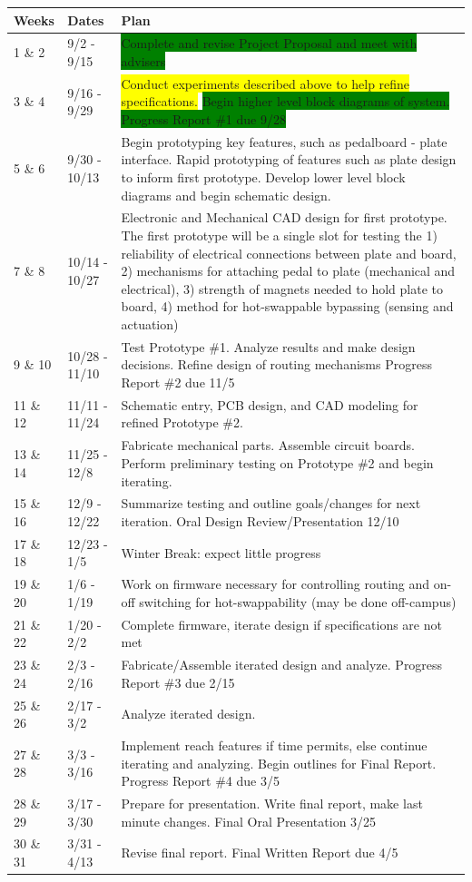 \documentclass{article}
\begin{document}
\begin{table}[H]
\begin{tabular}{llp{4in}}
Weeks    & Dates         & Plan \\
\hline
1 \& 2   & 9/2 - 9/15    &  \colorbox{green}{Complete and revise Project Proposal and meet with advisers}      \\
3 \& 4   & 9/16 - 9/29   &  \colorbox{yellow}{Conduct experiments described above to help refine specifications.}  \colorbox{green}{Begin higher level block diagrams of system.  Progress Report \#1 due 9/28}    \\
5 \& 6   & 9/30 - 10/13  &  Begin prototyping key features, such as pedalboard - plate interface. Rapid prototyping of features such as plate design to inform first prototype. Develop lower level block diagrams and begin schematic design.    \\
7 \& 8   & 10/14 - 10/27 &  Electronic and Mechanical CAD design for first prototype.  The first prototype will be a single slot for testing the 1) reliability of electrical connections between plate and board, 2) mechanisms for attaching pedal to plate (mechanical and electrical), 3) strength of magnets needed to hold plate to board, 4) method for hot-swappable bypassing (sensing and actuation)    \\
9 \& 10  & 10/28 - 11/10 &  Test Prototype \#1.  Analyze results and make design decisions.  Refine design of routing mechanisms Progress Report \#2 due 11/5    \\
11 \& 12 & 11/11 - 11/24 &  Schematic entry, PCB design, and CAD modeling for refined Prototype \#2.     \\
13 \& 14 & 11/25 - 12/8  &  Fabricate mechanical parts.  Assemble circuit boards.  Perform preliminary testing on Prototype \#2 and begin iterating.      \\
15 \& 16 & 12/9 - 12/22  &  Summarize testing and outline goals/changes for next iteration.  Oral Design Review/Presentation 12/10    \\
17 \& 18 & 12/23 - 1/5   &  Winter Break: expect little progress    \\
19 \& 20 & 1/6 - 1/19    &  Work on firmware necessary for controlling routing and on-off switching for hot-swappability (may be done off-campus)    \\
21 \& 22 & 1/20 - 2/2    &  Complete firmware, iterate design if specifications are not met   \\
23 \& 24 & 2/3 - 2/16    &  Fabricate/Assemble iterated design and analyze.  Progress Report \#3 due 2/15    \\
25 \& 26 & 2/17 - 3/2    &  Analyze iterated design.    \\
27 \& 28 & 3/3 - 3/16    &  Implement reach features if time permits, else continue iterating and analyzing.  Begin outlines for Final Report.  Progress Report \#4 due 3/5   \\
28 \& 29 & 3/17 - 3/30   &  Prepare for presentation.  Write final report, make last minute changes.  Final Oral Presentation 3/25  \\
30 \& 31 & 3/31 - 4/13   &  Revise final report.  Final Written Report due 4/5    
\end{tabular}
\end{table}
\end{document}
